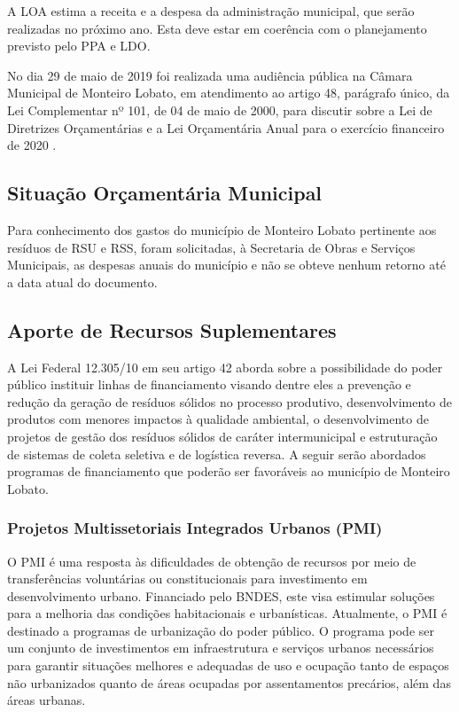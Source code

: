 	A LOA estima a receita e a despesa da administração municipal, que serão realizadas no próximo ano. Esta deve estar em coerência com o planejamento previsto pelo PPA e LDO.
	
	No dia 29 de maio de 2019 foi realizada uma audiência pública na Câmara Municipal de Monteiro Lobato, em atendimento ao artigo 48, parágrafo único, da Lei Complementar nº 101, de 04 de maio de 2000, para discutir sobre a Lei de Diretrizes Orçamentárias e a Lei Orçamentária Anual para o exercício financeiro de 2020 .
	
	\subsection{Situação Orçamentária Municipal}
	
	Para conhecimento dos gastos do município de Monteiro Lobato pertinente aos resíduos de RSU e RSS, foram solicitadas, à Secretaria de Obras e Serviços Municipais, as despesas anuais do município e não se obteve nenhum retorno até a data atual do documento.
	
	\subsection{Aporte de Recursos Suplementares}
	
	A Lei Federal 12.305/10 em seu artigo 42 aborda sobre a possibilidade do poder público instituir linhas de financiamento visando dentre eles a prevenção e redução da geração de resíduos sólidos no processo produtivo, desenvolvimento de produtos com menores impactos à qualidade ambiental, o desenvolvimento de projetos de gestão dos resíduos sólidos de caráter intermunicipal e estruturação de sistemas de coleta seletiva e de logística reversa. A seguir serão abordados programas de financiamento que poderão ser favoráveis ao município de Monteiro Lobato.
	
	\subsubsection{Projetos Multissetoriais Integrados Urbanos (PMI)}
	
	O PMI é uma resposta às dificuldades de obtenção de recursos por meio de transferências voluntárias ou constitucionais para investimento em desenvolvimento urbano. Financiado pelo BNDES, este visa estimular soluções para a melhoria das condições habitacionais e urbanísticas. 
	Atualmente, o PMI é destinado a programas de urbanização do poder público. O programa pode ser um conjunto de investimentos em infraestrutura e serviços urbanos necessários para garantir situações melhores e adequadas de uso e ocupação tanto de espaços não urbanizados quanto de áreas ocupadas por assentamentos precários, além das áreas urbanas.
	
